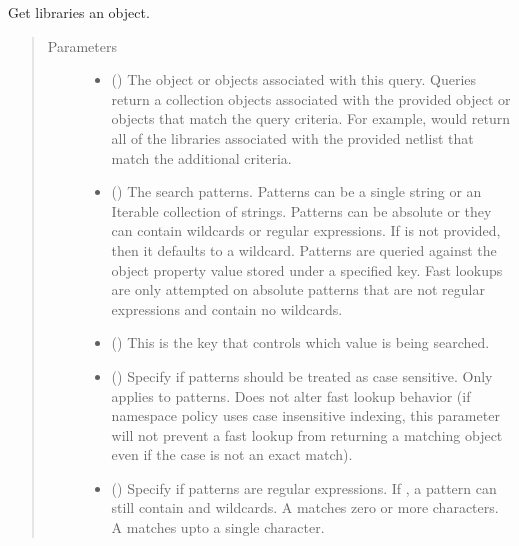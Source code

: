 \documentclass[letterpaper,10pt,english,openany,oneside]{sphinxmanual}
\begin{document}
\begin{fulllineitems}
\label{\detokenize{reference/classes/generated/spydrnet.get_libraries:spydrnet.get_libraries}}
Get libraries  an object.
\begin{quote}\begin{description}
\item[{Parameters}] \leavevmode\begin{itemize}
\item {} 
 () \textendash{} The object or objects associated with this query. Queries return a collection objects associated with the
provided object or objects that match the query criteria. For example,  would
return all of the libraries associated with the provided netlist that match the additional criteria.

\item {} 
 () \textendash{} The search patterns. Patterns can be a single string or an Iterable collection of strings. Patterns can be
absolute or they can contain wildcards or regular expressions. If  is not provided, then it defaults
to a wildcard. Patterns are queried against the object property value stored under a specified key. Fast lookups
are only attempted on absolute patterns that are not regular expressions and contain no wildcards.

\item {} 
 () \textendash{} This is the key that controls which value is being searched.

\item {} 
 () \textendash{} Specify if patterns should be treated as case sensitive. Only applies to patterns. Does not alter fast lookup
behavior (if namespace policy uses case insensitive indexing, this parameter will not prevent a fast lookup
from returning a matching object even if the case is not an exact match).

\item {} 
 () \textendash{} Specify if patterns are regular expressions. If , a pattern can still contain \sphinxtitleref{*} and  wildcards. A
\sphinxtitleref{*} matches zero or more characters. A  matches upto a single character.


\end{itemize}
\end{description}
\end{quote}
\end{fulllineitems}
\end{document}
